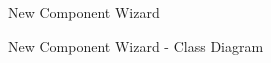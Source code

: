 \begin{figure}
	\centering
	\caption{New Component Wizard}
	\label{fig:new_component_wizard}
\end{figure}

\begin{figure}
	\centering
	\caption{New Component Wizard - Class Diagram}
	\label{fig:new_component_wizard_class_diagram}
\end{figure}

